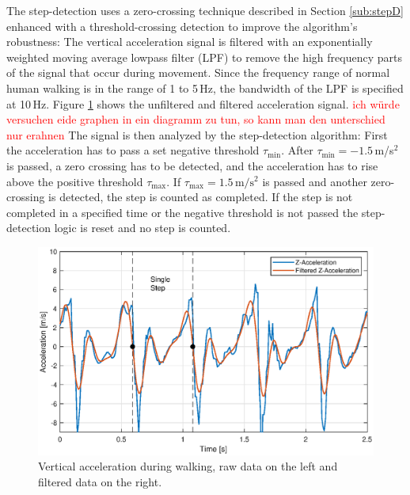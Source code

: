 \documentclass[engproc,conferenceproceedings,submit,pdftex,moreauthors]{Definitions/mdpi}
\begin{document}
 The step-detection uses a zero-crossing technique described in Section \ref{sub:stepD} enhanced with a threshold-crossing detection to improve the algorithm's robustness: The vertical acceleration signal is filtered with an exponentially weighted moving average lowpass filter (LPF) to remove the high frequency parts of the signal that occur during movement. Since the frequency range of normal human walking is in the range of 1 to 5\,Hz, the bandwidth of the LPF is specified at 10\,Hz. Figure \ref{fig:AccelWalk} shows the unfiltered and filtered acceleration signal. \textcolor{red}{ich würde versuchen eide graphen in ein diagramm zu tun, so kann man den unterschied nur erahnen} The signal is then analyzed by the step-detection algorithm: First the acceleration has to pass a set negative threshold $\tau_{\min}$. After $\tau_{\min} = -1.5$\,m/s$^2$ is passed, a zero crossing has to be detected, and the acceleration has to rise above the positive threshold $\tau_{\max}$. If $\tau_{\max} = 1.5\,\mathrm{m/s^2}$ is passed and another zero-crossing is detected, the step is counted as completed. If the step is not completed in a specified time or the negative threshold is not passed the step-detection logic is reset and no step is counted. 
\begin{figure}[h!]
	\centering
	\includegraphics[width=\textwidth]{WalkAcceleration.eps}
	\caption{Vertical acceleration during walking, raw data on the left and filtered data on the right.}
	\label{fig:AccelWalk}
\end{figure}
\end{document}
